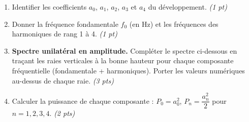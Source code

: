 \documentclass[a4paper,11pt]{article}
\begin{document}
\begin{enumerate}[label=\textbf{\arabic*.}]

  \item Identifier les coefficients $a_0$, $a_1$, $a_2$, $a_3$ et $a_4$ du développement.
        \hfill \textit{(1 pt)}
  \begin{tcolorbox}[reponsebox, height=1.8cm]\end{tcolorbox}

  \item Donner la fréquence fondamentale $f_0$ (en Hz) et les fréquences des harmoniques
        de rang 1 à 4.
        \hfill \textit{(1 pt)}
  \begin{tcolorbox}[reponsebox, height=2cm]\end{tcolorbox}

  \item \textbf{Spectre unilatéral en amplitude.}
        Compléter le spectre ci-dessous en traçant les raies verticales
        à la bonne hauteur pour chaque composante fréquentielle (fondamentale + harmoniques).
        Porter les valeurs numériques au-dessus de chaque raie.
        \hfill \textit{(3 pts)}

  \begin{center}
  \end{center}

  \item Calculer la puissance de chaque composante :
        $P_0 = a_0^2$, \; $P_n = \dfrac{a_n^2}{2}$ pour $n = 1, 2, 3, 4$.
        \hfill \textit{(2 pts)}
  \begin{tcolorbox}[reponsebox, height=3.5cm]\end{tcolorbox}


\end{enumerate}
\end{document}

